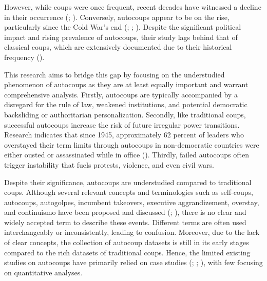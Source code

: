 \documentclass[
  12pt,
]{report}
\begin{document}
However, while coups were once frequent, recent decades have witnessed a
decline in their occurrence (;
). Conversely,
autocoups appear to be on the rise, particularly since the Cold War's
end (; ;
). Despite the
significant political impact and rising prevalence of autocoups, their
study lags behind that of classical coups, which are extensively
documented due to their historical frequency
().

This research aims to bridge this gap by focusing on the understudied
phenomenon of autocoups as they are at least equally important and
warrant comprehensive analysis. Firstly, autocoups are typically
accompanied by a disregard for the rule of law, weakened institutions,
and potential democratic backsliding or authoritarian personalization.
Secondly, like traditional coups, successful autocoups increase the risk
of future irregular power transitions. Research indicates that since
1945, approximately 62 percent of leaders who overstayed their term
limits through autocoups in non-democratic countries were either ousted
or assassinated while in office (). Thirdly, failed autocoups often trigger instability that fuels
protests, violence, and even civil wars.

Despite their significance, autocoups are understudied compared to
traditional coups. Although several relevant concepts and terminologies
such as self-coups, autocoups, autogolpes, incumbent takeovers,
executive aggrandizement, overstay, and continuismo have been proposed
and discussed (; ),
there is no clear and widely accepted term to describe these events.
Different terms are often used interchangeably or inconsistently,
leading to confusion. Moreover, due to the lack of clear concepts, the
collection of autocoup datasets is still in its early stages compared to
the rich datasets of traditional coups. Hence, the limited existing
studies on autocoups have primarily relied on case studies
(;
;
),
with few focusing on quantitative analyses.
\end{document}
